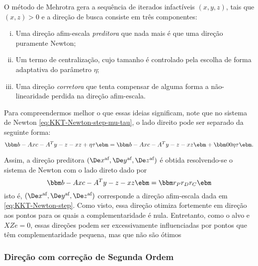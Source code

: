 O método de Mehrotra gera a sequência de iterados infactíveis
$(x,y,z)$, tais que $(x,z)>0$ e a direção de busca consiste em três componentes:
\begin{enumerate}[(i)]
  \item Uma  direção afim-escala \emph{preditora} que nada mais é que uma direção puramente Newton; 
  
  \item Um termo de centralização,
  cujo tamanho é controlado pela escolha de forma adaptativa do parâmetro $\eta$;
   \item Uma direção  \emph{corretora}  que tenta compensar de alguma forma a não-linearidade perdida na direção afim-escala.
\end{enumerate}




Para compreendermos melhor o que essas ideias significam, note que no sistema de
Newton \eqref{eq:KKT-Newton-step-mu-tau}, o lado direito pode ser separado da seguinte forma:
\[
\bbm b-Ax \\ c - A^Ty - z \\ -xz + \eta\tau \ebm = 
 \bbm b-Ax \\ c - A^Ty - z \\ -xz  \ebm +  \bbm 0 \\ 0 \\ 
 \eta\tau \ebm.
 \] 


Assim, a direção preditora $(\dex, \dey, \dez)$ é obtida resolvendo-se o
sistema de Newton com o lado direto dado por
 \begin{equation}
 \label{eq:afinne-scale-step}
 \bbm b-Ax\\ c - A^Ty - z \\ -xz  \ebm =  \bbm r_P\\ r_D \\ r_C  \ebm 
 \end{equation} 
 isto é,  $(\dex, \dey, \dez)$  corresponde a direção afim-escala dada em
\eqref{eq:KKT-Newton-step}. Como visto, essa direção otimiza fortemente em
direção aos pontos para os quais a complementaridade é nula. Entretanto, como o
alvo e $XZe = 0$, essas direções podem ser excessivamente influenciadas por
pontos que têm complementaridade pequena, mas que não são ótimos




\subsubsection{Direção com correção de Segunda Ordem}

